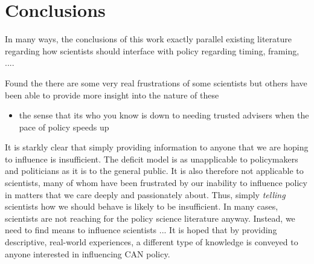 \chapter{Conclusions}\label{ch:conclusions}

In many ways, the conclusions of this work exactly parallel existing literature regarding how scientists should interface with policy regarding timing, framing, ....

Found the there are some very real frustrations of some scientists but others have been able to provide more insight into the nature of these

\begin{itemize}
    \item the sense that its who you know is down to needing trusted advisers when the pace of policy speeds up 
\end{itemize}

It is starkly clear that simply providing information to anyone that we are hoping to influence is insufficient. The deficit model is as unapplicable to policymakers and politicians as it is to the general public. It is also therefore not applicable to scientists, many of whom have been frustrated by our inability to influence policy in matters that we care deeply and passionately about. Thus, simply \emph{telling} scientists how we should behave is likely to be insufficient. In many cases, scientists are not reaching for the policy science literature anyway. Instead, we need to find means to influence scientists ... It is hoped that by providing descriptive, real-world experiences, a different type of knowledge is conveyed to anyone interested in influencing CAN policy. 